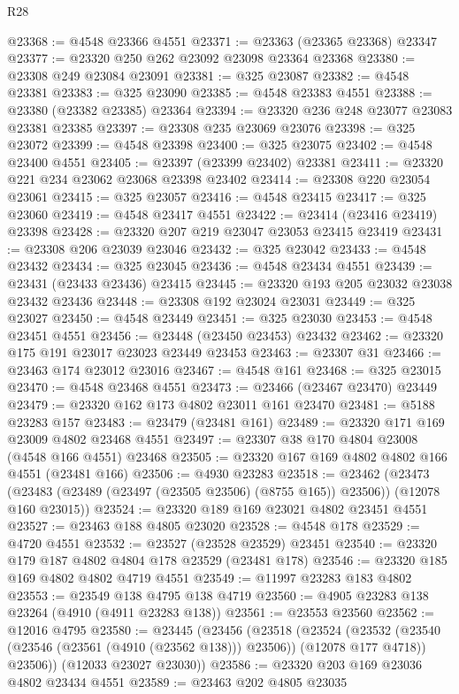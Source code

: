 \begin{lexlean}{R28}
\begin{coremodule}
@23368 := @4548 @23366 @4551
@23371 := @23363 (@23365 @23368) @23347
@23377 := @23320 @250 @262 @23092 @23098 @23364 @23368
@23380 := @23308 @249 @23084 @23091
@23381 := @325 @23087
@23382 := @4548 @23381
@23383 := @325 @23090
@23385 := @4548 @23383 @4551
@23388 := @23380 (@23382 @23385) @23364
@23394 := @23320 @236 @248 @23077 @23083 @23381 @23385
@23397 := @23308 @235 @23069 @23076
@23398 := @325 @23072
@23399 := @4548 @23398
@23400 := @325 @23075
@23402 := @4548 @23400 @4551
@23405 := @23397 (@23399 @23402) @23381
@23411 := @23320 @221 @234 @23062 @23068 @23398 @23402
@23414 := @23308 @220 @23054 @23061
@23415 := @325 @23057
@23416 := @4548 @23415
@23417 := @325 @23060
@23419 := @4548 @23417 @4551
@23422 := @23414 (@23416 @23419) @23398
@23428 := @23320 @207 @219 @23047 @23053 @23415 @23419
@23431 := @23308 @206 @23039 @23046
@23432 := @325 @23042
@23433 := @4548 @23432
@23434 := @325 @23045
@23436 := @4548 @23434 @4551
@23439 := @23431 (@23433 @23436) @23415
@23445 := @23320 @193 @205 @23032 @23038 @23432 @23436
@23448 := @23308 @192 @23024 @23031
@23449 := @325 @23027
@23450 := @4548 @23449
@23451 := @325 @23030
@23453 := @4548 @23451 @4551
@23456 := @23448 (@23450 @23453) @23432
@23462 := @23320 @175 @191 @23017 @23023 @23449 @23453
@23463 := @23307 @31
@23466 := @23463 @174 @23012 @23016
@23467 := @4548 @161
@23468 := @325 @23015
@23470 := @4548 @23468 @4551
@23473 := @23466 (@23467 @23470) @23449
@23479 := @23320 @162 @173 @4802 @23011 @161 @23470
@23481 := @5188 @23283 @157
@23483 := @23479 (@23481 @161)
@23489 := @23320 @171 @169 @23009 @4802 @23468 @4551
@23497 := @23307 @38 @170 @4804 @23008 (@4548 @166 @4551) @23468
@23505 := @23320 @167 @169 @4802 @4802 @166 @4551 (@23481 @166)
@23506 := @4930 @23283
@23518 := @23462
    (@23473 (@23483 (@23489 (@23497 (@23505 @23506) (@8755 @165)) @23506)) (@12078 @160 @23015))
@23524 := @23320 @189 @169 @23021 @4802 @23451 @4551
@23527 := @23463 @188 @4805 @23020
@23528 := @4548 @178
@23529 := @4720 @4551
@23532 := @23527 (@23528 @23529) @23451
@23540 := @23320 @179 @187 @4802 @4804 @178 @23529 (@23481 @178)
@23546 := @23320 @185 @169 @4802 @4802 @4719 @4551
@23549 := @11997 @23283 @183 @4802
@23553 := @23549 @138 @4795 @138 @4719
@23560 := @4905 @23283 @138 @23264 (@4910 (@4911 @23283 @138))
@23561 := @23553 @23560
@23562 := @12016 @4795
@23580 := @23445
    (@23456
      (@23518
        (@23524
          (@23532 (@23540 (@23546 (@23561 (@4910 (@23562 @138))) @23506)) (@12078 @177 @4718))
          @23506))
      (@12033 @23027 @23030))
@23586 := @23320 @203 @169 @23036 @4802 @23434 @4551
@23589 := @23463 @202 @4805 @23035

\end{coremodule}
\end{lexlean}
